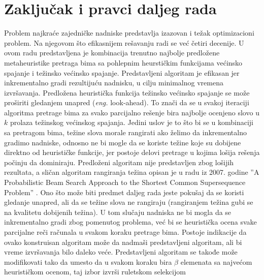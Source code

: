 \documentclass[12pt,oneside]{memoir}
\begin{document}
\chapter{Zaključak i pravci daljeg rada}
\label{chap:zakljucak}
Problem najkraće zajedničke nadniske predstavlja izazovan i težak optimizacioni problem.
Na njegovom što efikasnijem rešavanju radi se već četiri decenije.
U ovom radu predstavljena je kombinacija trenutno najbolje predložene metaheuristike
pretraga bima sa pohlepnim heurstičkim funkcijama većinsko spajanje i težinsko
većinsko spajanje. Predstavljeni algoritam je efikasan jer inkrementalno gradi rezultijuću nadnisku,
u cilju minimalnog vremena izvršavanja. Predložena heuristička funkcija težinsko većinsko
spajanje se može proširiti gledanjem unapred (\textit{eng.} look-ahead). To znači da se u svakoj
iteraciji algoritma pretrage bima za svako parcijalno rešenje bira najbolje ocenjeno slovo
u $k$ prolaza težinskog većinskog spajanja.
Jedini uslov je to što bi se u kombinaciji sa pretragom bima, težine slova
morale rangirati ako želimo da inkrementalno gradimo nadniske, odnosno ne bi mogle
da se koriste težine koje su dobijene direktno od heurističke funkcije,
jer postoje delovi pretrage u kojima lošija rešenja počinju da dominiraju.
Predloženi algoritam nije predstavljen zbog lošijih rezultata, a sličan
algoritam rangiranja težina opisan je u radu
iz 2007. godine ''A Probabilistic Beam Search Approach to the
Shortest Common Supersequence Problem'' \cite{ProbabilisticBS}.
Ono što može biti predmet daljeg rada jeste pokušaj da se koristi gledanje
unapred, ali da se težine slova ne rangiraju (rangiranjem težina gubi se
na kvalitetu dobijenih težina). U tom slučaju
nadniska ne bi mogla da se inkrementalno gradi zbog pomenutog problema,
već bi se heuristička ocena svake parcijalne reči računala
u svakom koraku pretrage bima. Postoje indikacije da ovako
konstruisan algoritam može da nadmaši predstavljeni algoritam, ali
bi vreme izvršavanja bilo daleko veće. Predstavljeni algoritam
se takođe može modifikovati tako da umesto da u svakom koraku bira $\beta$
elemenata sa najvećom heurističkom ocenom, taj izbor izvrši ruletskom selekcijom
\end{document}
